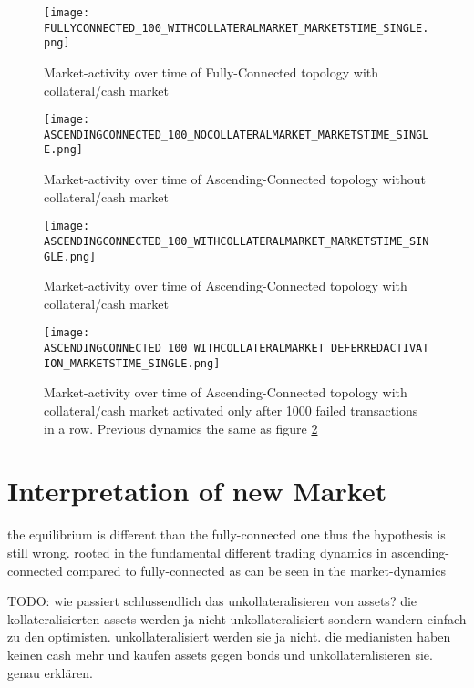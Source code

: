 \documentclass[Bachelorarbeit.tex]{subfiles}
\begin{document}
\begin{figure}[H]
	\centering
  \texttt{[image: FULLYCONNECTED\_100\_WITHCOLLATERALMARKET\_MARKETSTIME\_SINGLE.png]}
  	\caption{Market-activity over time of Fully-Connected topology with collateral/cash market}
	\label{fig:wealth_FULLYCONNECTED_100_WITHCOLLATERALMARKET_MARKETSTIME_REPL}
\end{figure}


\begin{figure}[H]
	\centering
  \texttt{[image: ASCENDINGCONNECTED\_100\_NOCOLLATERALMARKET\_MARKETSTIME\_SINGLE.png]}
	\caption{Market-activity over time of Ascending-Connected topology without collateral/cash market}
	\label{fig:wealth_ASCENDINGCONNECTED_100_WITHCOLLATERALMARKET_MARKETSTIME_REPL}
\end{figure}

\begin{figure}[H]
	\centering
  \texttt{[image: ASCENDINGCONNECTED\_100\_WITHCOLLATERALMARKET\_MARKETSTIME\_SINGLE.png]}
	\caption{Market-activity over time of Ascending-Connected topology with collateral/cash market}
	\label{fig:wealth_ASCENDINGCONNECTED_100_WITHCOLLATERALMARKET_MARKETSACCUM_REPL}
\end{figure}

\begin{figure}[H]
	\centering
  \texttt{[image: ASCENDINGCONNECTED\_100\_WITHCOLLATERALMARKET\_DEFERREDACTIVATION\_MARKETSTIME\_SINGLE.png]}
	\caption{Market-activity over time of Ascending-Connected topology with collateral/cash market activated only after 1000 failed transactions in a row. Previous dynamics the same as figure \ref{fig:wealth_ASCENDINGCONNECTED_100_WITHCOLLATERALMARKET_MARKETSTIME_REPL}}
	\label{fig:wealth_ASCENDINGCONNECTED_100_WITHCOLLATERALMARKET_DEFERREDACTIVATION_MARKETSTIME_SINGLE}
\end{figure}

\section{Interpretation of new Market}
the equilibrium is different than the fully-connected one thus the hypothesis is still wrong.
rooted in the fundamental different trading dynamics in ascending-connected compared to fully-connected as can be seen in the market-dynamics

TODO: wie passiert schlussendlich das unkollateralisieren von assets? die kollateralisierten assets werden ja nicht unkollateralisiert sondern wandern einfach zu den optimisten. unkollateralisiert werden sie ja nicht. die medianisten haben keinen cash mehr und kaufen assets gegen bonds und unkollateralisieren sie. genau erklären.
\end{document}
